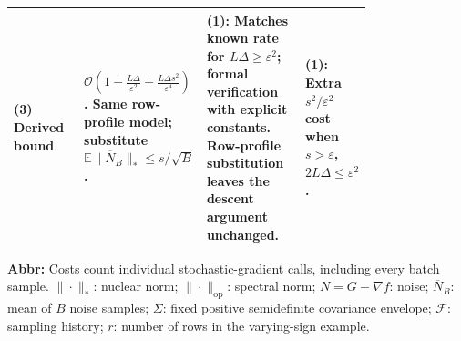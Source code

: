 \begin{table}[tp]
\begin{threeparttable}
\begin{tabularx}{\linewidth}{@{}>{\raggedright\arraybackslash}p{0.20\linewidth}>{\raggedright\arraybackslash}p{0.30\linewidth}>{\raggedright\arraybackslash}p{0.28\linewidth}>{\raggedright\arraybackslash}X@{}}
\midrule
\textbf{(3)} Derived bound \citep[Appendix D.1]{bssTaoYuZhang2026v1}
& $\mathcal{O}\!\left(1+\frac{L\Delta}{\varepsilon^2}+\frac{L\Delta s^2}{\varepsilon^4}\right)$.
Same row-profile model; substitute $\mathbb{E}\|\overline N_B\|_*\le s/\sqrt B$.
& \textbf{(1)}: Matches known rate for $L\Delta\ge\varepsilon^2$; formal verification with explicit constants. Row-profile substitution leaves the descent argument unchanged.
& \textbf{(1)}: Extra $s^2/\varepsilon^2$ cost when $s>\varepsilon$, $2L\Delta\le\varepsilon^2$. \\
\bottomrule
\end{tabularx}
\begin{tablenotes}[flushleft]\footnotesize
\item[] \textbf{Abbr:} Costs count individual stochastic-gradient calls, including every batch sample. $\|\cdot\|_*$: nuclear norm; $\|\cdot\|_{\mathrm{op}}$: spectral norm; $N=G-\nabla f$: noise; $\overline N_B$: mean of $B$ noise samples; $\Sigma$: fixed positive semidefinite covariance envelope; $\mathcal F$: sampling history; $r$: number of rows in the varying-sign example.
\end{tablenotes}
\end{threeparttable}
\end{table}
